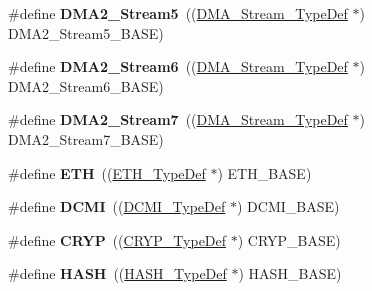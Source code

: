 \begin{DoxyCompactItemize}
\item 
\hypertarget{group___peripheral__declaration_gac40f58718761251875b5a897287efd83}{\#define {\bfseries D\-M\-A2\-\_\-\-Stream5}~((\hyperlink{struct_d_m_a___stream___type_def}{D\-M\-A\-\_\-\-Stream\-\_\-\-Type\-Def} $\ast$) D\-M\-A2\-\_\-\-Stream5\-\_\-\-B\-A\-S\-E)}\label{group___peripheral__declaration_gac40f58718761251875b5a897287efd83}

\item 
\hypertarget{group___peripheral__declaration_ga11a00b283e0911cd427e277e5a314ccc}{\#define {\bfseries D\-M\-A2\-\_\-\-Stream6}~((\hyperlink{struct_d_m_a___stream___type_def}{D\-M\-A\-\_\-\-Stream\-\_\-\-Type\-Def} $\ast$) D\-M\-A2\-\_\-\-Stream6\-\_\-\-B\-A\-S\-E)}\label{group___peripheral__declaration_ga11a00b283e0911cd427e277e5a314ccc}

\item 
\hypertarget{group___peripheral__declaration_gacc135dbca0eca67d5aa0abc555f053ce}{\#define {\bfseries D\-M\-A2\-\_\-\-Stream7}~((\hyperlink{struct_d_m_a___stream___type_def}{D\-M\-A\-\_\-\-Stream\-\_\-\-Type\-Def} $\ast$) D\-M\-A2\-\_\-\-Stream7\-\_\-\-B\-A\-S\-E)}\label{group___peripheral__declaration_gacc135dbca0eca67d5aa0abc555f053ce}

\item 
\hypertarget{group___peripheral__declaration_ga3a3f60de4318afbd0b3318e7a416aadc}{\#define {\bfseries E\-T\-H}~((\hyperlink{struct_e_t_h___type_def}{E\-T\-H\-\_\-\-Type\-Def} $\ast$) E\-T\-H\-\_\-\-B\-A\-S\-E)}\label{group___peripheral__declaration_ga3a3f60de4318afbd0b3318e7a416aadc}

\item 
\hypertarget{group___peripheral__declaration_ga049d9f61cb078d642e68f3c22bb6d90c}{\#define {\bfseries D\-C\-M\-I}~((\hyperlink{struct_d_c_m_i___type_def}{D\-C\-M\-I\-\_\-\-Type\-Def} $\ast$) D\-C\-M\-I\-\_\-\-B\-A\-S\-E)}\label{group___peripheral__declaration_ga049d9f61cb078d642e68f3c22bb6d90c}

\item 
\hypertarget{group___peripheral__declaration_gaf8c417168aefe66429b5f1b6adc9effa}{\#define {\bfseries C\-R\-Y\-P}~((\hyperlink{struct_c_r_y_p___type_def}{C\-R\-Y\-P\-\_\-\-Type\-Def} $\ast$) C\-R\-Y\-P\-\_\-\-B\-A\-S\-E)}\label{group___peripheral__declaration_gaf8c417168aefe66429b5f1b6adc9effa}

\item 
\hypertarget{group___peripheral__declaration_ga7172fe24d1ffc31d15b20a77ea9f34dd}{\#define {\bfseries H\-A\-S\-H}~((\hyperlink{struct_h_a_s_h___type_def}{H\-A\-S\-H\-\_\-\-Type\-Def} $\ast$) H\-A\-S\-H\-\_\-\-B\-A\-S\-E)}\label{group___peripheral__declaration_ga7172fe24d1ffc31d15b20a77ea9f34dd}


\end{DoxyCompactItemize}
